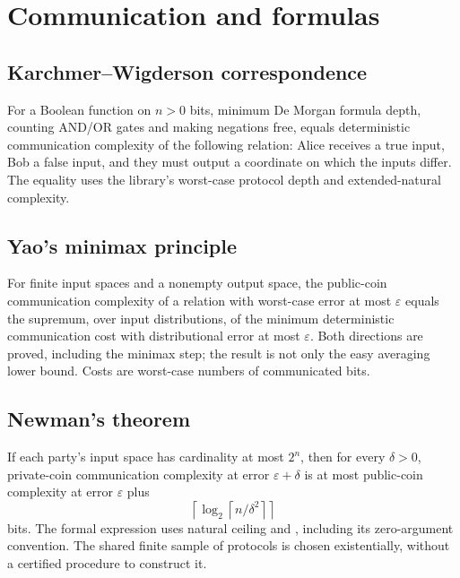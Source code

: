 \section{Communication and formulas}

\begin{result}
\subsection{Karchmer--Wigderson correspondence}
For a Boolean function on $n>0$ bits, minimum De Morgan formula depth, counting
AND/OR gates and making negations free, equals deterministic communication
complexity of the following relation: Alice receives a true input, Bob a false
input, and they must output a coordinate on which the inputs differ. The equality
uses the library's worst-case protocol depth and extended-natural complexity.
\citep{KarchmerWigderson1990}
\end{result}

\begin{result}
\subsection{Yao's minimax principle}
For finite input spaces and a nonempty output space, the public-coin communication
complexity of a relation with worst-case error at most $\varepsilon$ equals the
supremum, over input distributions, of the minimum deterministic communication
cost with distributional error at most $\varepsilon$. Both directions are proved,
including the minimax step; the result is not only the easy averaging lower bound.
Costs are worst-case numbers of communicated bits.\citep{Yao1977,KushilevitzNisan1997}
\end{result}

\begin{result}
\subsection{Newman's theorem}
If each party's input space has cardinality at most $2^n$, then for every
$\delta>0$, private-coin communication complexity at error $\varepsilon+\delta$
is at most public-coin complexity at error $\varepsilon$ plus
\[
\left\lceil\log_2\left\lceil n/\delta^2\right\rceil\right\rceil
\]
bits. The formal expression uses natural ceiling and , including
its zero-argument convention. The shared finite sample of protocols is chosen
existentially, without a certified procedure to construct it.\citep{Newman1991}
\end{result}

